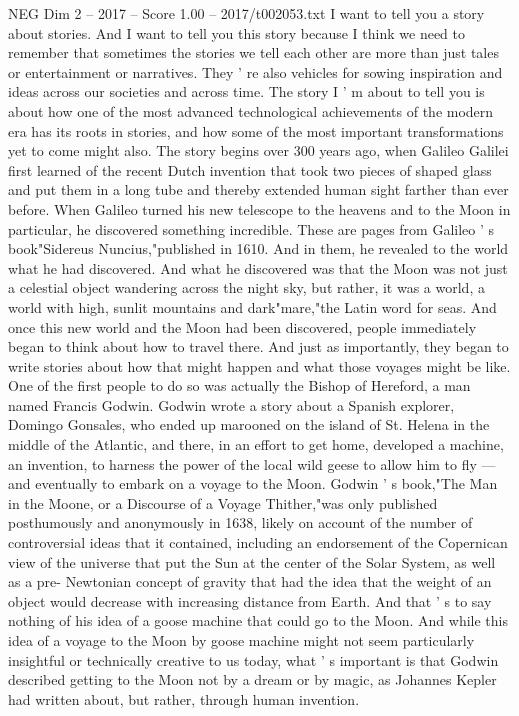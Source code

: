 \begin{textsample}{NEG Dim 2 – 2017 – Score 1.00 – 2017/t002053.txt}  \label{ex:f2_neg_052}
I want to tell you a story about stories.
And I want to tell you this story because I think we need to remember that sometimes the stories we tell each other are more than just tales or entertainment or narratives.
They ' re also vehicles for sowing inspiration and ideas across our societies and across time.
The story I ' m about to tell you is about how one of the most advanced technological achievements of the modern era has its roots in stories, and how some of the most important transformations yet to come might also.
The story begins over 300 years ago, when Galileo Galilei first learned of the recent Dutch invention that took two pieces of shaped glass and put them in a long tube and thereby extended human sight farther than ever before.
When Galileo turned his new telescope to the heavens and to the Moon in particular, he discovered something incredible.
These are pages from Galileo ' s book"Sidereus Nuncius,"published in 1610.
And in them, he revealed to the world what he had discovered.
And what he discovered was that the Moon was not just a celestial object wandering across the night sky, but rather, it was a world, a world with high, sunlit mountains and dark"mare,"the Latin word for seas.
And once this new world and the Moon had been discovered, people immediately began to think about how to travel there.
And just as importantly, they began to write stories about how that might happen and what those voyages might be like.
One of the first people to do so was actually the Bishop of Hereford, a man named Francis Godwin.
Godwin wrote a story about a Spanish explorer, Domingo Gonsales, who ended up marooned on the island of St.
Helena in the middle of the Atlantic, and there, in an effort to get home, developed a machine, an invention, to harness the power of the local wild geese to allow him to fly — and eventually to embark on a voyage to the Moon.
Godwin ' s book,"The Man in the Moone, or a Discourse of a Voyage Thither,"was only published posthumously and anonymously in 1638, likely on account of the number of controversial ideas that it contained, including an endorsement of the Copernican view of the universe that put the Sun at the center of the Solar System, as well as a pre- Newtonian concept of gravity that had the idea that the weight of an object would decrease with increasing distance from Earth.
And that ' s to say nothing of his idea of a goose machine that could go to the Moon.
And while this idea of a voyage to the Moon by goose machine might not seem particularly insightful or technically creative to us today, what ' s important is that Godwin described getting to the Moon not by a dream or by magic, as Johannes Kepler had written about, but rather, through human invention.

\end{textsample}
